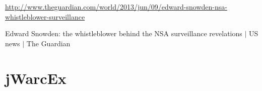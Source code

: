 \documentclass[a4paper,12pt,titlepage=false]{scrreprt}
\begin{document}

\scriptsize
\vspace{.1cm}
\url{http://www.theguardian.com/world/2013/jun/09/edward-snowden-nsa-whistleblower-surveillance}

\scriptsize
Edward Snowden: the whistleblower behind the NSA surveillance revelations $|$ US news $|$ The Guardian

\section{jWarcEx}
\end{document}
